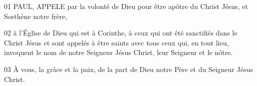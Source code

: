 01 PAUL, APPELE par la volonté de Dieu pour être apôtre du Christ Jésus, et Sosthène notre frère,

02 à l’Église de Dieu qui est à Corinthe, à ceux qui ont été sanctifiés dans le Christ Jésus et sont appelés à être saints avec tous ceux qui, en tout lieu, invoquent le nom de notre Seigneur Jésus Christ, leur Seigneur et le nôtre.

03 À vous, la grâce et la paix, de la part de Dieu notre Père et du Seigneur Jésus Christ.
